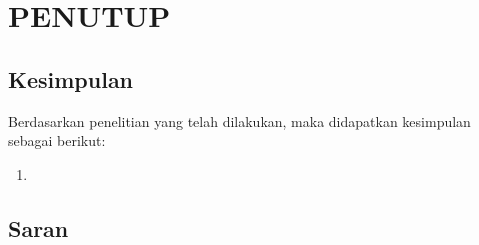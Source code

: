 \chapter{PENUTUP}
\section{Kesimpulan}
Berdasarkan penelitian yang telah dilakukan, maka didapatkan kesimpulan sebagai berikut:
\begin{enumerate}
	\item 
\end{enumerate}
\section{Saran}